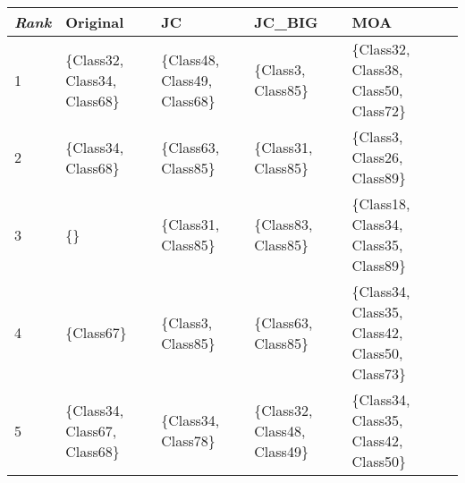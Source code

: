 \begin{tabular}{lllll}
	\toprule
	\textit{Rank} & Original                      & JC                            & JC\_BIG                       & MOA                                             \\
	\midrule
	1             & \{Class32, Class34, Class68\} & \{Class48, Class49, Class68\} & \{Class3, Class85\}           & \{Class32, Class38, Class50, Class72\}          \\[3pt]
	2             & \{Class34, Class68\}          & \{Class63, Class85\}          & \{Class31, Class85\}          & \{Class3, Class26, Class89\}                    \\[3pt]
	3             & \{\}                          & \{Class31, Class85\}          & \{Class83, Class85\}          & \{Class18, Class34, Class35, Class89\}          \\[3pt]
	4             & \{Class67\}                   & \{Class3, Class85\}           & \{Class63, Class85\}          & \{Class34, Class35, Class42, Class50, Class73\} \\[3pt]
	5             & \{Class34, Class67, Class68\} & \{Class34, Class78\}          & \{Class32, Class48, Class49\} & \{Class34, Class35, Class42, Class50\}          \\
	\bottomrule
\end{tabular}

